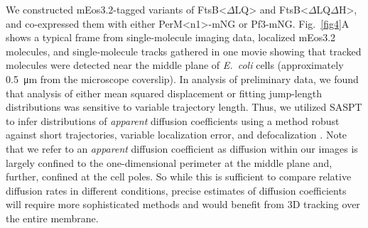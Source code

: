 \documentclass[twocolumn,pdflatex,sn-nature]{sn-jnl}%
\def\textsuperscript#1{<#1>}%
\newcommand\ec{\textit{E.~coli}}
\newcommand\ftsbdLQ{FtsB\textsuperscript{$\Delta{}$LQ}}
\newcommand\ftsbdLQdH{FtsB\textsuperscript{$\Delta{}$LQ$\Delta{}$H}}
\newcommand\permN{PerM\textsuperscript{n1}}
\begin{document}
We constructed mEos3.2-tagged variants of \ftsbdLQ{} and \ftsbdLQdH{}, and co-expressed them with either \permN{}-mNG or Pf3-mNG.
Fig.~\ref{fig4}A shows a typical frame from single-molecule imaging data, localized mEos3.2 molecules, and single-molecule tracks gathered in one movie showing that tracked molecules were detected near the middle plane of \ec{} cells (approximately \qty{0.5}{\um} from the microscope coverslip).
In analysis of preliminary data, we found that analysis of either mean squared displacement or fitting jump-length distributions was sensitive to variable trajectory length.
Thus, we utilized SASPT \citep{heckertRecoveringMixturesFastdiffusing2022a} to infer distributions of \textit{apparent} diffusion coefficients using a method robust against short trajectories, variable localization error, and defocalization \cite{hansenRobustModelbasedAnalysis2018a}.
Note that we refer to an \textit{apparent} diffusion coefficient as diffusion within our images is largely confined to the one-dimensional perimeter at the middle plane and, further, confined at the cell poles.
So while this is sufficient to compare relative diffusion rates in different conditions, precise estimates of diffusion coefficients will require more sophisticated methods and would benefit from 3D tracking over the entire membrane.
\end{document}
